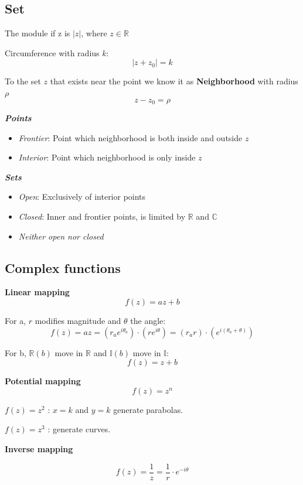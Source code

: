 \documentclass[letterpaper]{article}
\newcommand{\divline}{\noindent\makebox[\linewidth]{\rule{\textwidth}{0.4pt}}}
\begin{document}
	\begin{multicols}{3}
		\section{Set}
			The module if z is \(|z|\), where \(z \in \mathbb{R}\)
			
			Circumference with radius \(k\):
			\[|z + z_0| = k\]
			
			To the set \(z\) that exists near the point we know it as \textbf{Neighborhood} with radius \(\rho\)
			\[z - z_0 = \rho\]
			
			\textit{\textbf{Points}}
			
			\begin{itemize}
				\item \textit{Frontier}: Point which neighborhood is both inside and outside \(z\)
				\item \textit{Interior}: Point which neighborhood is only inside \(z\)
			\end{itemize}
			
			\textit{\textbf{Sets}}
			
			\begin{itemize}
				\item \textit{Open}: Exclusively of interior points
				\item \textit{Closed}: Inner and frontier points, is limited by \(\mathbb{R}\) and \(\mathbb{C}\)
				\item \textit{Neither open nor closed}
			\end{itemize}
	\end{multicols}
 
	\divline
 
	\begin{multicols}{3}
		\section{Complex functions}
			\textbf{Linear mapping}
				\[f(z) = az + b\]
				
				For a, \(r\) modifies magnitude and \(\theta\) the angle:
				\[f(z) = az = (r_ae^{i\theta_a}) \cdot (re^{i\theta}) = (r_ar) \cdot (e^{i(\theta_a + \theta)})\]
				
				For b, \(\mathbb{R}(b)\) move in \(\mathbb{R}\) and \(\mathbb{I}(b)\) move in \(\mathbb{I}\):
				\[f(z) = z + b\]

			\textbf{Potential mapping}
				\[f(z) = z^{n}\]
				
				\(f(z) = z^{2}\) : \(x = k\) and \(y = k\) generate parabolas.
				
				\(f(z) = z^{3}\) : generate curves.
			
			\textbf{Inverse mapping}
			
				\[f(z) = \frac{1}{z} = \frac{1}{r} \cdot e^{-i\theta}\]
	\end{multicols}
 
\end{document}
